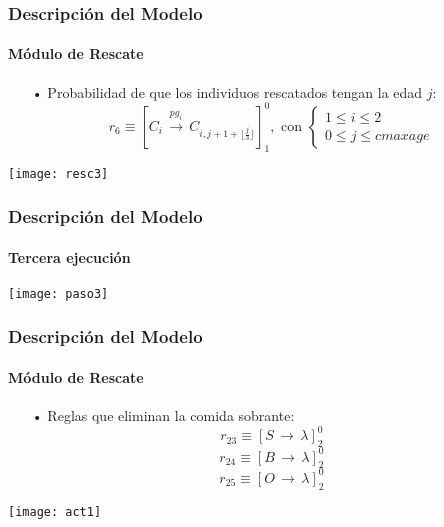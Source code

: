 \documentclass[10pt,a4paper]{beamer}
\theoremstyle{definition}
\theoremstyle{remark}
\begin{document}
\begin{frame}
\frametitle{Descripción del Modelo}
\framesubtitle{Módulo de Rescate}
\begin{small}
\begin{itemize}
\item[•] Probabilidad de que los individuos rescatados tengan la edad $j$:
$$r_6 \equiv [C_i \,\xrightarrow{pg_i} \, C_{i,j+1+ \lfloor \frac{j}{3} \rfloor} ]^0_1 , \text{ con } \left \{ \begin{matrix} 1 \leq i \leq 2
\\ 0 \leq j \leq cmaxage \end{matrix}\right. $$
\end{itemize}
\end{small}
\begin{center}
\texttt{[image: resc3]}
\end{center}
\end{frame}

\begin{frame}
\frametitle{Descripción del Modelo}
\framesubtitle{Tercera ejecución}
\begin{center}
\texttt{[image: paso3]}
\end{center}
\end{frame}

\begin{frame}
\frametitle{Descripción del Modelo}
\framesubtitle{Módulo de Rescate}
\begin{small}
\begin{itemize}
\item[•] Reglas que eliminan la comida sobrante:
$$r_{23} \equiv [S \, \longrightarrow \, \lambda]^0_2$$
$$r_{24} \equiv [B \, \longrightarrow \, \lambda]^0_2$$
$$r_{25} \equiv [O \, \longrightarrow \, \lambda]^0_2$$
\end{itemize}
\end{small}
\begin{center}
\texttt{[image: act1]}
\end{center}
\end{frame}
\end{document}

